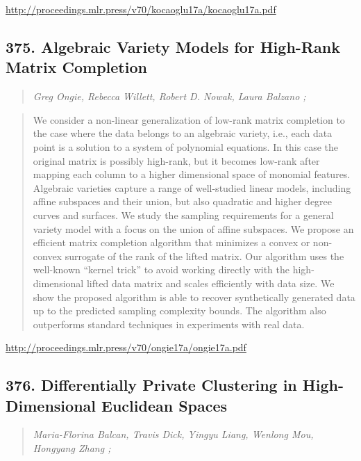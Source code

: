 \documentclass{article}
\begin{document}
\href{http://proceedings.mlr.press/v70/kocaoglu17a/kocaoglu17a.pdf}{http://proceedings.mlr.press/v70/kocaoglu17a/kocaoglu17a.pdf}

\subsection{375. Algebraic Variety Models for High-Rank Matrix Completion}

\begin{quote}
\footnotesize{\textit{Greg Ongie, Rebecca Willett, Robert D. Nowak, Laura Balzano ;}}
\end{quote}

\begin{quote}
    We consider a non-linear generalization of low-rank matrix completion to the case where the data belongs to an algebraic variety, i.e., each data point is a solution to a system of polynomial equations. In this case the original matrix is possibly high-rank, but it becomes low-rank after mapping each column to a higher dimensional space of monomial features. Algebraic varieties capture a range of well-studied linear models, including affine subspaces and their union, but also quadratic and higher degree curves and surfaces. We study the sampling requirements for a general variety model with a focus on the union of affine subspaces. We propose an efficient matrix completion algorithm that minimizes a convex or non-convex surrogate of the rank of the lifted matrix. Our algorithm uses the well-known “kernel trick” to avoid working directly with the high-dimensional lifted data matrix and scales efficiently with data size. We show the proposed algorithm is able to recover synthetically generated data up to the predicted sampling complexity bounds. The algorithm also outperforms standard techniques in experiments with real data.  \end{quote}

\href{http://proceedings.mlr.press/v70/ongie17a/ongie17a.pdf}{http://proceedings.mlr.press/v70/ongie17a/ongie17a.pdf}

\subsection{376. Differentially Private Clustering in High-Dimensional Euclidean Spaces}

\begin{quote}
\footnotesize{\textit{Maria-Florina Balcan, Travis Dick, Yingyu Liang, Wenlong Mou, Hongyang Zhang ;}}
\end{quote}
\end{document}
